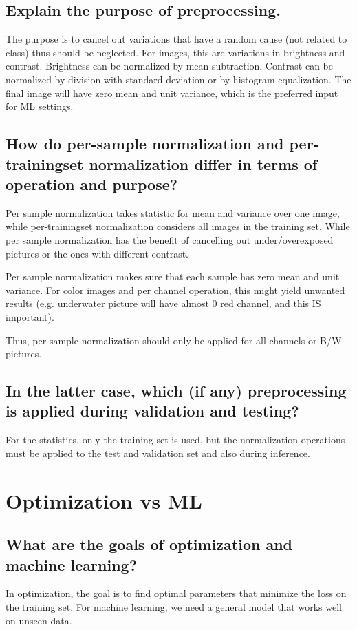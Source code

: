 \subsection{Explain the purpose of preprocessing.}

The purpose is to cancel out variations that have a random cause (not related to class) thus should be neglected. For images, this are variations in brightness and contrast. Brightness can be normalized by mean subtraction. Contrast can be normalized by division with standard deviation or by histogram equalization. The final image will have zero mean and unit variance, which is the preferred input for ML settings.

\subsection{How do per-sample normalization and per-trainingset normalization differ in terms of operation and purpose?}
Per sample normalization takes statistic for mean and variance over one image, while per-trainingset normalization considers all images in the training set.
While per sample normalization has the benefit of cancelling out under/overexposed pictures or the ones with different contrast.

Per sample normalization makes sure that each sample has zero mean and unit variance. For color images and per channel operation, this might yield unwanted results (e.g. underwater picture will have almost 0 red channel, and this IS important).

Thus, per sample normalization should only be applied for all channels or B/W pictures.

\subsection{In the latter case, which (if any) preprocessing is applied during validation and testing?}

For the statistics, only the training set is used, but the normalization operations must be applied to the test and validation set and also during inference.

\section{Optimization vs ML}
\subsection{What are the goals of optimization and machine learning?}
In optimization, the goal is to find optimal parameters that minimize the loss on the training set.  
For machine learning, we need a general model that works well on unseen data. 
